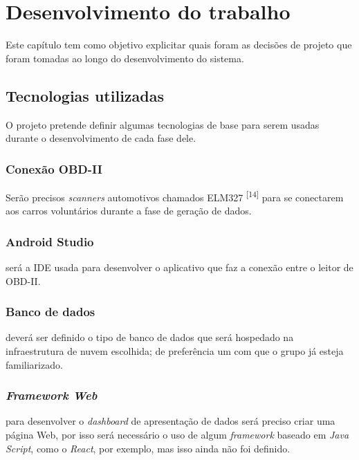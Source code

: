 \chapter{Desenvolvimento do trabalho}


Este capítulo tem como objetivo explicitar quais foram as decisões de projeto que foram tomadas ao longo do desenvolvimento do sistema.

\section{Tecnologias utilizadas}
O projeto pretende definir algumas tecnologias de base para serem usadas durante o desenvolvimento de cada fase dele.

    \subsection{Conexão OBD-II}
    Serão precisos \textit{scanners} automotivos chamados ELM327 \textsuperscript{[14]} para se conectarem aos carros voluntários durante a fase de geração de dados.
    
    \subsection{Android Studio} será a IDE usada para desenvolver o aplicativo que faz a conexão entre o leitor de OBD-II.
    
     \subsection{Banco de dados} deverá ser definido o tipo de banco de dados que será hospedado na infraestrutura de nuvem escolhida; de preferência um com que o grupo já esteja familiarizado.
    
     \subsection{\textit{Framework Web}} para desenvolver o \textit{dashboard} de apresentação de dados será preciso criar uma página Web, por isso será necessário o uso de algum \textit{framework} baseado em \textit{Java Script}, como o \textit{React}, por exemplo, mas isso ainda não foi definido.
    

